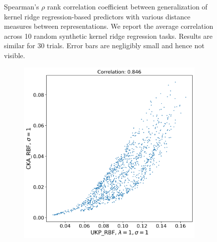 \documentclass{article}
\theoremstyle{plain}
\begin{document}
\begin{figure}[!h]
    \caption{Spearman's $\rho$ rank correlation coefficient between generalization of kernel ridge regression-based predictors with various distance measures between representations. We report the average correlation across 10 random synthetic kernel ridge regression tasks. Results are similar for 30 trials. Error bars are negligibly small and hence not visible.}
    \label{MNIST generalization plots}
\end{figure}

\raggedbottom

\begin{figure}[!h]
    \centering
    \begin{subfigure}[b]{0.45\textwidth}
        \includegraphics[width=\textwidth]{Appendix figures/mnist_experiments/Correlation/Correlation plot for CKA_dist_RBF_1.000000e+00 and UKP_dist_RBF_1.000000e+00_1.000000e+00.png}
    \end{subfigure}
    \hfill
    \begin{subfigure}[b]{0.45\textwidth}

\end{subfigure}
\end{figure}
\end{document}
